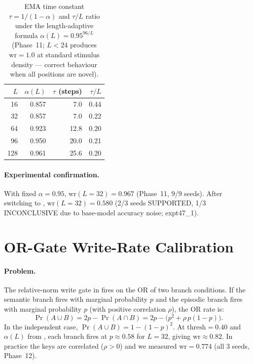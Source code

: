 \documentclass{article}
\begin{document}
\begin{table}[h]
  \centering
  \small
  \caption{EMA time constant $\tau = 1/(1-\alpha)$ and $\tau/L$ ratio under the
    length-adaptive formula $\alpha(L) = 0.95^{96/L}$
    (Phase~11; $L < 24$ produces $\mathrm{wr}=1.0$ at standard stimulus density —
    correct behaviour when all positions are novel).}
  \label{tab:ema}
  \begin{tabular}{rrrr}
    \toprule
    $L$ & $\alpha(L)$ & $\tau$ (steps) & $\tau/L$ \\
    \midrule
    16  & 0.857 &  7.0  & 0.44 \\
    32  & 0.857 &  7.0  & 0.22 \\
    64  & 0.923 & 12.8  & 0.20 \\
    96  & 0.950 & 20.0  & 0.21 \\
    128 & 0.961 & 25.6  & 0.20 \\
    \bottomrule
  \end{tabular}
\end{table}

\paragraph{Experimental confirmation.}
With fixed $\alpha=0.95$, $\mathrm{wr}(L{=}32) = 0.967$ (Phase~11, 9/9 seeds).
After switching to , $\mathrm{wr}(L{=}32) = 0.580$ (2/3 seeds
SUPPORTED, 1/3 INCONCLUSIVE due to base-model accuracy noise; expt47\_1).

\section{OR-Gate Write-Rate Calibration}
\label{sec:gate}

\paragraph{Problem.}
The relative-norm write gate in  fires on the OR of two branch conditions.
If the semantic branch fires with marginal probability $p$ and the episodic branch fires
with marginal probability $p$ (with positive correlation $\rho$), the OR rate is:
\begin{equation}
  \Pr(A \cup B) = 2p - \Pr(A \cap B) = 2p - \bigl(p^2 + \rho\,p(1-p)\bigr).
\end{equation}
In the independent case, $\Pr(A \cup B) = 1-(1-p)^2$.  At $\mathrm{thresh}=0.40$ and
$\alpha(L)$ from , each branch fires at $p \approx 0.58$ for $L=32$,
giving $\mathrm{wr} \approx 0.82$.  In practice the keys are correlated ($\rho > 0$)
and we measured $\mathrm{wr}=0.774$ (all 3 seeds, Phase~12).
\end{document}
